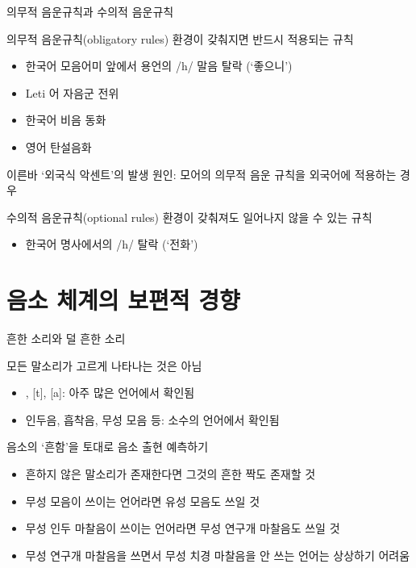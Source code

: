 \documentclass[11pt, aspectratio=169]{beamer}
\newcommand{\textds}[1]{{\ipafont #1}}
\begin{document}
\begin{frame}[t]{의무적 음운규칙과 수의적 음운규칙}
    \begin{block}{의무적 음운규칙(obligatory rules)}
        환경이 갖춰지면 반드시 적용되는 규칙
        \begin{itemize}
            \item 한국어 모음어미 앞에서 용언의 /h/ 말음 탈락 (‘좋으니’)
            \item Leti 어 자음군 전위
            \item 한국어 비음 동화
            \item 영어 탄설음화
        \end{itemize}
    \end{block}
    이른바 ‘외국식 악센트’의 발생 원인: 모어의 의무적 음운 규칙을 외국어에 적용하는 경우
    \begin{block}{수의적 음운규칙(optional rules)}
        환경이 갖춰져도 일어나지 않을 수 있는 규칙
        \begin{itemize}
            \item 한국어 명사에서의 /h/ 탈락 (‘전화’)
        \end{itemize}
    \end{block}
\end{frame}

\section{음소 체계의 보편적 경향}

\begin{frame}[t]{흔한 소리와 덜 흔한 소리}
    \begin{block}{모든 말소리가 고르게 나타나는 것은 아님}
        \begin{itemize}
            \item \textds{[p], [t], [a]}: 아주 많은 언어에서 확인됨
            \item 인두음, 흡착음, 무성 모음 등: 소수의 언어에서 확인됨
        \end{itemize}
    \end{block}
    \begin{block}{음소의 ‘흔함’을 토대로 음소 출현 예측하기}
        \begin{itemize}
            \item 흔하지 않은 말소리가 존재한다면 그것의 흔한 짝도 존재할 것
            \item [] 무성 모음이 쓰이는 언어라면 유성 모음도 쓰일 것
            \item [] 무성 인두 마찰음이 쓰이는 언어라면 무성 연구개 마찰음도 쓰일 것
            \item 무성 연구개 마찰음을 쓰면서 무성 치경 마찰음을 안 쓰는 언어는 상상하기 어려움
        \end{itemize}
    \end{block}
\end{frame}
\end{document}
